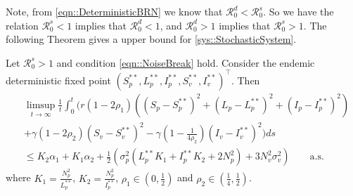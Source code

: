 Note, from \autoref{eqn::DeterministicBRN} we know that
$\mathcal{R}^d_0<\mathcal{R}_0 ^ s $. So we have the relation 
$\mathcal{R}_0 ^s <1 $ implies that $\mathcal{R}_0 ^ d<1$, and 
$\mathcal{R}_0 ^d >1 $ implies that $\mathcal{R}_0 ^ s>1$. The following 
Theorem gives a upper bound for \autoref{sys::StochasticSystem}.
%
\begin{theorem}
	\label{thm::UpperBound}
	Let $\mathcal{R}^s_0>1$ and condition \autoref{eqn::NoiseBreak} hold. 
	Consider the endemic deterministic fixed point 
	$(S_p^{**},L_p^{**},I_p^{**},S_v^{**},I_v^{**})^\top$. Then 
	\begin{equation}\label{eqn::UP-1}
		\begin{aligned}
			&\limsup\limits_{t \rightarrow 	\infty}
			\frac{1}{t}
			\int_{0}^{t}( r
				\left(
					1 - 2 \rho_1
				\right)
				\left(
					(S_p - S_p^{**}) ^ 2 + 
					(L_p - L_p^{**}) ^ 2 + 
					(I_p - I_p^{**}) ^ 2
				\right)
			\\
			&+
				\gamma
				\left(
					1 - 2 \rho_2
				\right)
				(S_v - S_v^{**}) ^ 2 - 
				\gamma
				\left(
					1 - 
					\frac{1}{4 \rho_2}
				\right)
				(I_v - I_v^{**})^2)ds
			\\
			&\leq
				K_2
				\alpha_1 + K_1
				\alpha_2 + 
				\frac{1}{2}
				\left(
					\sigma_p ^ 2
					( L_p ^{**}K_1 + I_p ^{**} K_2 + 2N_p^2)
					+3 N_v^2 \sigma_v^2
				\right)
				\qquad\mbox{a.s.}
		\end{aligned}
	\end{equation}
%
	where 
	$
		K_1 = \frac{N_p^2}{L_p^{**}}
	$, 
	$
		K_2 = \frac{N_p^2}{I_p^{**}}
	$, 
	$
		\rho_1 \in (0, \frac{1}{2})
	$ and 
	$
		\rho_2\in (\frac{1}{4}, \frac{1}{2})
	$.
\end{theorem}
%
